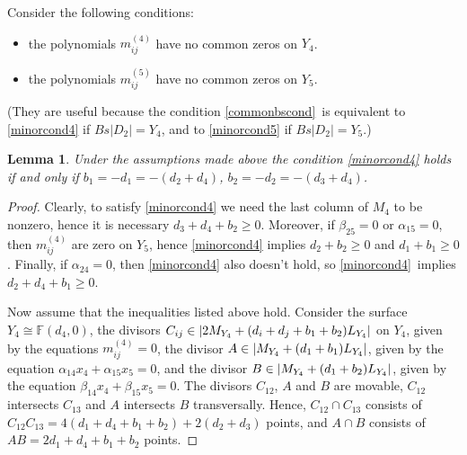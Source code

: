 \documentclass[12pt]{amsart}
\makeatletter
\newcommand{\symbitem}[1]{\item[#1]%
\renewcommand{\@currentlabel}{#1}\ignorespaces}
\newtheorem{lemma}[equation]{Lemma}
\theoremstyle{definition}
\theoremstyle{remark}
\makeatother
\begin{document}
Consider the following conditions:
\begin{itemize}
\symbitem{$(**)_4$}\label{minorcond4} the polynomials $m^{(4)}_{ij}$ 
have no common zeros on $Y_4$.
\symbitem{$(**)_5$}\label{minorcond5} 
the polynomials $m^{(5)}_{ij}$ have no common zeros on $Y_5$.
\end{itemize}
(They are useful because the condition 
\ref{commonbscond}\ is equivalent to \ref{minorcond4} if $Bs|D_2|=Y_4$, 
and to \ref{minorcond5} if $Bs|D_2|=Y_5$.)

\begin{lemma}\label{lemma:M4-minors}
Under the assumptions made above the condition \ref{minorcond4} 
holds if and only if 
$b_1=-d_1=-(d_2+d_4)$, $b_2=-d_2=-(d_3+d_4)$.
\end{lemma}
\begin{proof}
Clearly, to satisfy \ref{minorcond4} we need the last column of $M_4$ to be 
nonzero, hence it is necessary $d_3+d_4+b_2\geqslant 0$. Moreover, 
if $\beta_{25}=0$ or $\alpha_{15}=0$, then $m^{(4)}_{ij}$ are zero on $Y_5$, 
hence \ref{minorcond4} implies $d_2+b_2\geqslant 0$ and $d_1+b_1\geqslant 0$. 
Finally, if
$\alpha_{24}=0$, then \ref{minorcond4} also doesn't hold, so \ref{minorcond4}\
implies $d_2+d_4+b_1\geqslant 0$.

Now assume that the inequalities listed above hold.
Consider the surface $Y_4\cong{\mathbb{F}}(d_4, 0)$, the divisors 
$C_{ij}\in |2M_{Y_4}+(d_i+d_j+b_1+\nolinebreak b_2)L_{Y_4}|$ on $Y_4$, 
given by the equations 
$m^{(4)}_{ij}=0$, the divisor
$A\in |M_{Y_4}+\nolinebreak (d_1+\nolinebreak b_1)L_{Y_4}|$, 
given by the equation $\alpha_{14}x_4+\alpha_{15}x_5=0$, 
and the divisor $B\in |M_{Y_4}+\nolinebreak (d_1+\nolinebreak b_2)L_{Y_4}|$,
given by the equation $\beta_{14}x_4+\beta_{15}x_5=0$. 
The divisors $C_{12}$, $A$ and $B$ are movable, $C_{12}$ intersects $C_{13}$ 
and $A$ intersects $B$ transversally. Hence, $C_{12}\cap C_{13}$ 
consists of $C_{12}C_{13}=4(d_1+d_4+b_1+b_2)+2(d_2+d_3)$ points, and $A\cap B$ 
consists of $AB=2d_1+d_4+b_1+b_2$ points. 


\end{proof}
\end{document}
